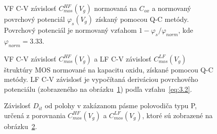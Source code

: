 \newpage
\begin{figure}[h!]\centering
  \begin{minipage}[c]{\myfiguresize}
    \begin{center}
      
      \caption[VF C-V závislosť $C_{mos}^{HF}(V_{g})$ a priebeh
        povrchového potenciálu $\varphi_{s}(V_{g})$ štruktúry MOS
        získané pomocou Q-C metódy]{VF C-V závislosť
        $C_{mos}^{HF}(V_{g})$ normovaná na $C_{ox}$ a normovaný
        povrchový potenciál $\varphi_{s}(V_{g})$ získaný pomocou Q-C
        metódy. Povrchový potenciál je normovaný vzťahom
        $1-{\varphi_{s}}/{\varphi_{norm}}$, kde
        $\varphi_{norm}=3.33$.}\label{fig:4.6}
    \end{center}
  \end{minipage}
\end{figure}

\begin{figure}[h!]\centering
  \begin{minipage}[c]{\myfiguresize}
    \begin{center}
      
      \caption[VF C-V závislosť $C_{mos}^{HF}(V_{g})$ a LF C-V
        závislosť $C_{mos}^{LF}(V_{g})$ štruktúry MOS normované na
        kapacitu oxidu, získané pomocou Q-C metódy]{VF C-V závislosť
        $C_{mos}^{HF}(V_{g})$ a LF C-V závislosť $C_{mos}^{LF}(V_{g})$
        štruktúry MOS normované na kapacitu oxidu, získané pomocou Q-C
        metódy.  LF C-V závislosť je vypočítaná deriváciou povrchového
        potenciálu (zobrazeného na obrázku~\ref{fig:4.6}) podľa
        vzťahu~\ref{eq:3.2}.}\label{fig:4.7}
    \end{center}
  \end{minipage}
\end{figure}

\newpage
\begin{figure}[h!]\centering
  \begin{minipage}[c]{\myfiguresize}
    \begin{center}
      
      \caption[Závislosť $D_{it}$ od polohy v zakázanom pásme
        polovodiča typu P, určená z porovnania $C_{mos}^{HF}(V_{g})$ a
        $C_{mos}^{LF}(V_{g})$]{Závislosť $D_{it}$ od polohy v
        zakázanom pásme polovodiča typu P, určená z porovnania
        $C_{mos}^{HF}(V_{g})$ a $C_{mos}^{LF}(V_{g})$, ktoré sú
        zobrazené na obrázku~\ref{fig:4.7}.}\label{fig:4.8}
    \end{center}
  \end{minipage}
\end{figure}

